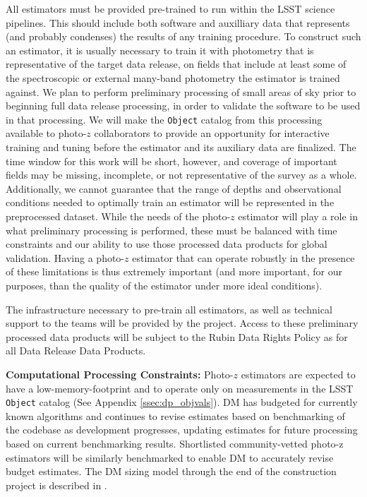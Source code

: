 \documentclass[DM,lsstdraft,toc]{lsstdoc}
\begin{document}
All estimators must be provided pre-trained to run within the LSST science pipelines. 
This should include both software and auxilliary data that represents (and probably condenses) the results of any training procedure.
To construct such an estimator, it is usually necessary to train it with photometry that is representative of the target data release, on fields that include at least some of the spectroscopic or external many-band photometry the estimator is trained against.
We plan to perform preliminary processing of small areas of sky prior to beginning full data release processing, in order to validate the software to be used in that processing.
We will make the {\tt Object} catalog from this processing available to photo-$z$ collaborators to provide an opportunity for interactive training and tuning before the estimator and its auxiliary data are finalized.
The time window for this work will be short, however, and coverage of important fields may be missing, incomplete, or not representative of the survey as a whole.
Additionally, we cannot guarantee that the range of depths and observational conditions needed to optimally train an estimator will be represented in the preprocessed dataset. 
While the needs of the photo-$z$ estimator will play a role in what preliminary processing is performed, these must be balanced with time constraints and our ability to use those processed data products for global validation.
Having a photo-$z$ estimator that can operate robustly in the presence of these limitations is thus extremely important (and more important, for our purposes, than the quality of the estimator under more ideal conditions).

The infrastructure necessary to pre-train all estimators, as well as technical support to the teams will be provided by the project. 
Access to these preliminary processed data products will be subject to the Rubin Data Rights Policy as for all Data Release Data Products. 


 
\textbf{Computational Processing Constraints:}
Photo-$z$ estimators are expected to have a low-memory-footprint and to operate only on measurements in the LSST {\tt Object} catalog (See Appendix \ref{ssec:dp_objvals}). 
DM has budgeted for currently known algorithms and continues to revise estimates based on benchmarking of the codebase as development progresses, updating estimates for future processing based on current benchmarking results.  
Shortlisted community-vetted photo-z estimators will be similarly benchmarked to enable DM to accurately revise budget estimates. 
The DM sizing model through the end of the construction project is described in \cite{dmtn-135}.
\end{document}
